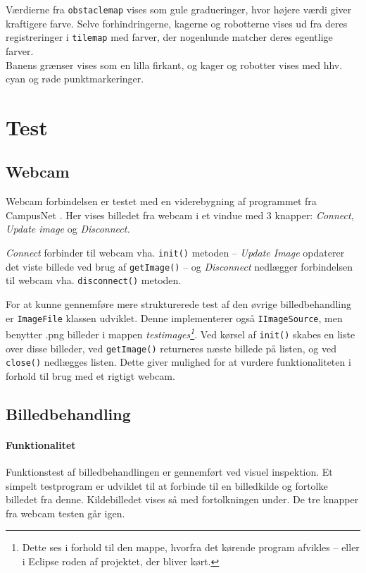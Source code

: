 Værdierne fra \texttt{obstaclemap} vises som gule gradueringer, hvor højere værdi giver kraftigere farve. Selve forhindringerne, kagerne og robotterne vises ud fra deres registreringer i \texttt{tilemap} med farver, der nogenlunde matcher deres egentlige farver.\\
Banens grænser vises som en lilla firkant, og kager og robotter vises med hhv. cyan og røde punktmarkeringer.
\begin{comment}
Webcam
	mode
	player?
	
Processor
	Thresholds
	Resolution
\end{comment}

\section{Test}
\subsection{Webcam}
Webcam forbindelsen er testet med en viderebygning af programmet fra CampusNet . Her vises billedet fra webcam i et vindue med 3 knapper: \textit{Connect}, \textit{Update image} og \textit{Disconnect.}

\textit{Connect} forbinder til webcam vha. \texttt{init()} metoden -- \textit{Update Image} opdaterer det viste billede ved brug af \texttt{getImage()} -- og \textit{Disconnect} nedlægger forbindelsen til webcam vha. \texttt{disconnect()} metoden.

For at kunne gennemføre mere strukturerede test af den øvrige billedbehandling er \texttt{ImageFile} klassen udviklet. Denne implementerer også \texttt{IImageSource}, men benytter .png billeder i mappen \textit{testimages\footnote{Dette ses i forhold til den mappe, hvorfra det kørende program afvikles -- eller i Eclipse roden af projektet, der bliver kørt.}}. Ved kørsel af \texttt{init()} skabes en liste over disse billeder, ved \texttt{getImage()} returneres næste billede på listen, og ved \texttt{close()} nedlægges listen. Dette giver mulighed for at vurdere funktionaliteten i forhold til brug med et rigtigt webcam.

\subsection{Billedbehandling}
\paragraph{Funktionalitet}
Funktionstest af billedbehandlingen er gennemført ved visuel inspektion. Et simpelt testprogram er udviklet til at forbinde til en billedkilde og fortolke billedet fra denne. Kildebilledet vises så med fortolkningen under. De tre knapper fra webcam testen går igen.

